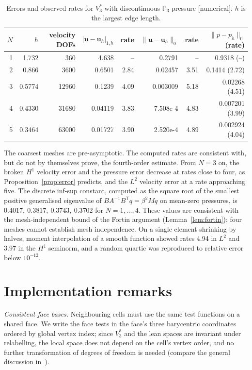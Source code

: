 \documentclass[11pt,a4paper]{article}
\theoremstyle{definition}
\theoremstyle{remark}
\newcommand{\evid}[1]{\textsf{[#1]}}
\newcommand{\Pol}{\mathbb P}
\begin{document}
\begin{table}[ht]
\centering
\caption{Errors and observed rates for \(V_3^*\) with discontinuous \(\Pol_3\)
pressure \evid{numerical}. \(h\) is the largest edge length.}
\label{tab:stokes}
\begin{tabular}{rrrrrrrr}
\toprule
\(N\)&\(h\)&velocity DOFs&\(|\mathbf u-\mathbf u_h|_{1,h}\)&rate&
\(\|\mathbf u-\mathbf u_h\|_0\)&rate&\(\|p-p_h\|_0\) (rate)\\
\midrule
1&1.732&360&4.638&--&0.2791&--&0.9318 (--)\\
2&0.866&3600&0.6501&2.84&0.02457&3.51&0.1414 (2.72)\\
3&0.5774&12960&0.1239&4.09&0.003009&5.18&0.02268 (4.51)\\
4&0.4330&31680&0.04119&3.83&7.508e-4&4.83&0.007201 (3.99)\\
5&0.3464&63000&0.01727&3.90&2.520e-4&4.89&0.002924 (4.04)\\
\bottomrule
\end{tabular}
\end{table}

The coarsest meshes are pre-asymptotic. The computed rates are consistent
with, but do not by themselves prove, the fourth-order estimate. From \(N=3\) on, the broken
\(H^1\) velocity error and the pressure error decrease at rates close to
four, as Proposition~\ref{prop:error} predicts, and the \(L^2\) velocity error
at a rate approaching five. The discrete inf-sup constant, computed as the
square root of the smallest positive generalised eigenvalue of
\(BA^{-1}B^{\mathsf T}q=\beta^2Mq\) on mean-zero pressures, is
\(0.4017,\ 0.3817,\ 0.3743,\ 0.3702\) for \(N=1,\dots,4\). These values
are consistent with the mesh-independent bound of the Fortin argument
(Lemma~\ref{lem:fortin}); four meshes cannot establish mesh independence. On a single element shrinking by halves, moment
interpolation of a smooth function showed rates 4.94 in \(L^2\) and 3.97 in the
\(H^1\) seminorm, and a random quartic was reproduced to relative error below
\(10^{-12}\).

\section{Implementation remarks}
\label{sec:implementation}

\emph{Consistent face bases.} Neighbouring cells must use the same test
functions on a shared face. We write the face tests in the face's three
barycentric coordinates ordered by global vertex index; since \(V_3^*\) and the
lean spaces are invariant under relabelling, the local space does not depend
on the cell's vertex order, and no further transformation of degrees of
freedom is needed (compare the general discussion in~\cite{SDRW2022}).
\end{document}
